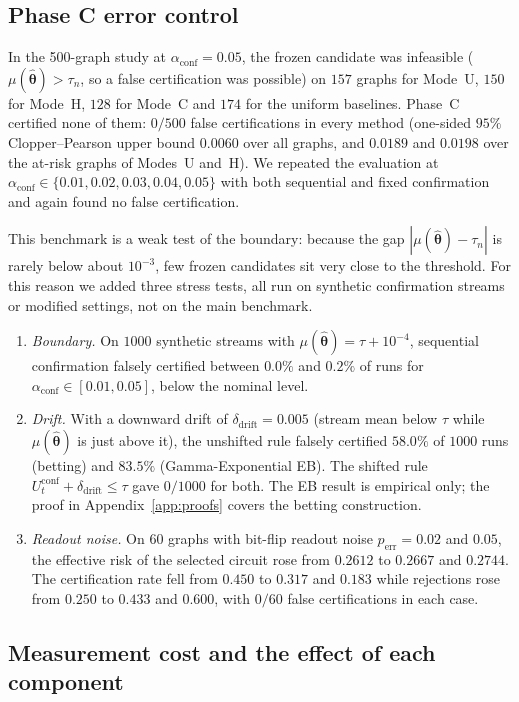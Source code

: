 \documentclass[a4paper,onecolumn,unpublished]{quantumarticle}
\newcommand{\aconf}{\alpha_{\mathrm{conf}}}
\newcommand{\ddrift}{\delta_{\mathrm{drift}}}
\newcommand{\thhat}{\widehat{\bm{\theta}}}
\begin{document}
\subsection{Phase C error control}
\label{sec:res_error_control}

In the 500-graph study at $\aconf = 0.05$, the frozen candidate was infeasible ($\mu(\thhat) > \tau_n$, so a false certification was possible) on $157$ graphs for Mode~U, $150$ for Mode~H, $128$ for Mode~C and $174$ for the uniform baselines. Phase~C certified none of them: $0/500$ false certifications in every method (one-sided $95\%$ Clopper--Pearson upper bound $0.0060$ over all graphs, and $0.0189$ and $0.0198$ over the at-risk graphs of Modes~U and~H). We repeated the evaluation at $\aconf \in \{0.01, 0.02, 0.03, 0.04, 0.05\}$ with both sequential and fixed confirmation and again found no false certification.

This benchmark is a weak test of the boundary: because the gap $|\mu(\thhat) - \tau_n|$ is rarely below about $10^{-3}$, few frozen candidates sit very close to the threshold. For this reason we added three stress tests, all run on synthetic confirmation streams or modified settings, not on the main benchmark.
\begin{enumerate}
  \item \emph{Boundary.} On $1000$ synthetic streams with $\mu(\thhat) = \tau + 10^{-4}$, sequential confirmation falsely certified between $0.0\%$ and $0.2\%$ of runs for $\aconf \in [0.01, 0.05]$, below the nominal level.
  \item \emph{Drift.} With a downward drift of $\ddrift = 0.005$ (stream mean below $\tau$ while $\mu(\thhat)$ is just above it), the unshifted rule falsely certified $58.0\%$ of $1000$ runs (betting) and $83.5\%$ (Gamma-Exponential EB). The shifted rule $U_t^{\mathrm{conf}} + \ddrift \le \tau$ gave $0/1000$ for both. The EB result is empirical only; the proof in Appendix~\ref{app:proofs} covers the betting construction.
  \item \emph{Readout noise.} On $60$ graphs with bit-flip readout noise $p_{\mathrm{err}} = 0.02$ and $0.05$, the effective risk of the selected circuit rose from $0.2612$ to $0.2667$ and $0.2744$. The certification rate fell from $0.450$ to $0.317$ and $0.183$ while rejections rose from $0.250$ to $0.433$ and $0.600$, with $0/60$ false certifications in each case.
\end{enumerate}

\subsection{Measurement cost and the effect of each component}
\label{sec:res_cost}
\end{document}
